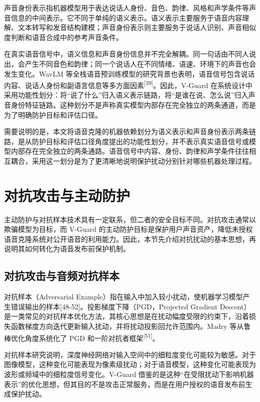 声音身份表示指机器模型用于表达说话人身份、音色、韵律、风格和声学条件等声音信息的中间表示。它不同于单纯的语义表示。语义表示主要服务于语音内容理解、文本转写和发音结构建模；声音身份表示则主要服务于说话人识别、声音相似度判断和语音合成中的参考声音条件。

在真实语音信号中，语义信息和声音身份信息并不完全解耦。同一句话由不同人说出，会产生不同音色和韵律；同一个说话人在不同情绪、语速、环境下的声音也会发生变化。WavLM
等全栈语音预训练模型的研究背景也表明，语音信号包含说话内容、说话人身份和副语言信息等多方面因素\textsuperscript{{[}39{]}}。因此，V-Guard
在系统设计中采用功能性划分：将``说了什么''归入语义表示链路，将``是谁在说、怎么说''归入声音身份特征链路。这种划分不是声称真实模型内部存在完全独立的两条通道，而是为了明确防护目标和评估口径。

需要说明的是，本文将语音克隆的机器依赖划分为语义表示和声音身份表示两条链路，是从防护目标和评估口径角度提出的功能性划分，并不表示真实语音信号或模型内部存在完全独立的两条通路。语音信号中内容、身份、韵律和声学条件往往相互耦合，采用这一划分是为了更清晰地说明保护扰动分别针对哪些机器处理过程。

\section{对抗攻击与主动防护}\label{ux5bf9ux6297ux653bux51fbux4e0eux4e3bux52a8ux9632ux62a4}

主动防护与对抗样本技术具有一定联系，但二者的安全目标不同。对抗攻击通常以欺骗模型为目标，而
V-Guard
的主动防护目标是保护用户声音资产，降低未授权语音克隆系统对公开语音的利用能力。因此，本节先介绍对抗扰动的基本思想，再说明其如何转化为语音发布前保护机制。

\subsection{对抗攻击与音频对抗样本}\label{ux5bf9ux6297ux653bux51fbux4e0eux97f3ux9891ux5bf9ux6297ux6837ux672c}

对抗样本（Adversarial
Example）指在输入中加入较小扰动，使机器学习模型产生错误输出的样本{[}48-52{]}。投影梯度下降（PGD，Projected
Gradient
Descent）是一类常见的对抗样本优化方法，其核心思想是在扰动幅度受限的约束下，沿着损失函数梯度方向迭代更新输入扰动，并将扰动投影回允许范围内。Madry
等从鲁棒优化角度系统化了 PGD
和一阶对抗者框架\textsuperscript{{[}51{]}}。

对抗样本研究说明，深度神经网络对输入空间中的细粒度变化可能较为敏感。对于图像模型，这种变化可能表现为像素级扰动；对于语音模型，这种变化可能表现为波形或频域中的细粒度信号变化。V-Guard
借鉴的是这种``在受限扰动下影响机器表示''的优化思想，但其目的不是攻击正常服务，而是在用户授权的语音发布前生成保护扰动。

